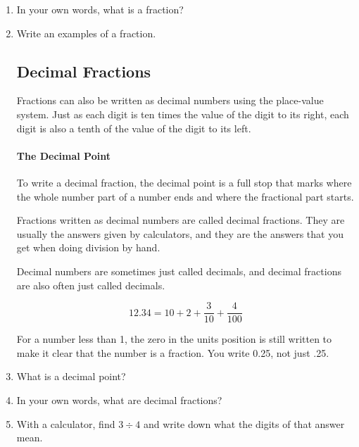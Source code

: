 \documentclass{article}
\begin{document}
\begin{enumerate}
\item In your own words, what is a fraction?
\item Write an examples of a fraction.

\subsection*{Decimal Fractions}
Fractions can also be written as decimal numbers using the place-value system. Just as each digit is ten times the value of the digit to its right, each digit is also a tenth of the value of the digit to its left.

\paragraph{The Decimal Point}
To write a decimal fraction, the decimal point is a full stop that marks where the whole number part of a number ends and where the fractional part starts.

Fractions written as decimal numbers are called decimal fractions. They are usually the answers given by calculators, and they are the answers that you get when doing division by hand.

Decimal numbers are sometimes just called decimals, and decimal fractions are also often just called decimals.

$$12.34 = 10 + 2 + \frac{3}{10} + \frac{4}{100}$$

For a number less than 1, the zero in the units position is still written to make it clear that the number is a fraction. You write 0.25, not just .25.

\item What is a decimal point?
\item In your own words, what are decimal fractions?
\item With a calculator, find $3 \div 4$ and write down what the digits of that answer mean.

\end{enumerate}
\end{document}
